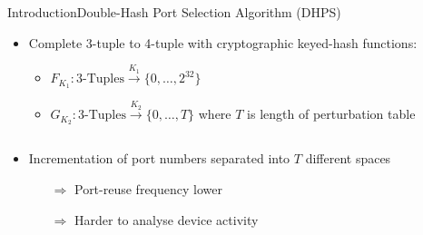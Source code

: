 \documentclass[aspectratio=169, hyperref={colorlinks=true, allcolors=SecondaryColor}, c]{beamer}
\begin{document}
\begin{frame}[fragile]{Introduction}{Double-Hash Port Selection Algorithm (DHPS)}
	\begin{itemize}
		\item \alert{Complete 3-tuple to 4-tuple} with cryptographic keyed-hash functions:
		\begin{itemize}
			\scriptsize
			\item \( F_{K_1}: \text{3-Tuples} \xrightarrow{K_1} \{0, \ldots, 2^{32}\}\)
			\item \( G_{K_2}: \text{3-Tuples} \xrightarrow{K_2} \{0, \ldots, T\}\) where $T$ is length of \alert{perturbation table}
		\end{itemize}
	\end{itemize}
	\begin{columns}
		\begin{column}{0.5\textwidth}
			\begin{itemize}
				\item Incrementation of port numbers separated into \alert{$T$ different spaces}
				\begin{itemize}
					\item[\alert{$\Rightarrow$}] Port-reuse frequency lower %
					\item[\alert{$\Rightarrow$}] Harder to analyse device activity %
				\end{itemize}
			\end{itemize}
		\end{column}
		\begin{column}{0.5\textwidth}
			\begin{center}
				\begin{adjustbox}{max width=\textwidth}
				\end{adjustbox}
			\end{center}
		\end{column}
	\end{columns}
\end{frame}
\end{document}
